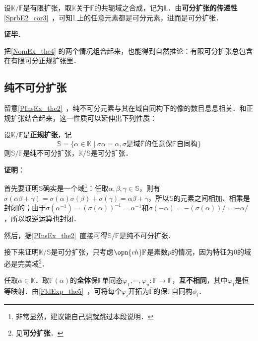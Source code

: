 设$\mathbb{K}/\mathbb{F}$是有限扩张，取$\mathbb{K}$关于$\mathbb{F}$的共轭域之合成，记为$\mathbb{L}$．由\textbf{可分扩张的传递性}\autoref{SprbE2_cor3}~，可知$\mathbb{L}$上的任意元素都是可分元素，进而是可分扩张．

\textbf{证毕}．

把\autoref{NomEx_the4} 的两个情况组合起来，也能得到自然推论：有限可分扩张总包含在有限可分正规扩张里．


\subsection{纯不可分扩张}



留意\autoref{PInsEx_the2}~，纯不可分元素与其在域自同构下的像的数目息息相关．和正规扩张结合起来，这一性质可以延伸出下列性质：

\begin{theorem}{}\label{NomEx_the5}
设$\mathbb{K}/\mathbb{F}$是\textbf{正规扩张}，记
\begin{equation}\label{NomEx_eq1}
\mathbb{S}=\{\alpha\in\mathbb{K}\mid \sigma\alpha = \alpha, \sigma\text{是域}\overline{\mathbb{F}}\text{的任意保}\mathbb{F}\text{自同构}\}
\end{equation}
则$\mathbb{S}/\mathbb{F}$是纯不可分扩张，$\mathbb{K}/\mathbb{S}$是可分扩张．
\end{theorem}

\textbf{证明}：

首先要证明$\mathbb{S}$确实是一个域\footnote{非常显然，建议能自己想就跳过本段说明．}：任取$\alpha, \beta, \gamma\in\mathbb{S}$，则有$\sigma(\alpha\beta+\gamma)=\sigma(\alpha)\sigma(\beta)+\sigma(\gamma)=\alpha\beta+\gamma$，所以$\mathbb{S}$的元素之间相加、相乘是封闭的；由于$\sigma(\alpha^{-1})=(\sigma(\alpha))^{-1}=\alpha^{-1}$和$\sigma(-\alpha)=-(\sigma(\alpha))/=-\alpha/$，所以取逆运算也封闭．

然后，据\autoref{PInsEx_the2}~直接可得$\mathbb{S}/\mathbb{F}$是纯不可分扩张．

接下来证明$\mathbb{K}/\mathbb{S}$是可分扩张，只考虑$\opn{ch}\mathbb{F}$是素数$p$的情况，因为特征为$0$的域必是完美域\footnote{见\textbf{可分扩张}．}．

任取$\alpha\in\mathbb{K}$．取$\mathbb{F}(\alpha)$的\textbf{全体}保$\mathbb{F}$单同态$\varphi_1, \cdots, \varphi_n:\mathbb{F}\to\overline{\mathbb{F}}$，\textbf{互不相同}，其中$\varphi_1$是恒等映射．由\autoref{FldExp_the5}~，可将每个$\varphi_i$开拓为$\overline{\mathbb{F}}$的保$\mathbb{F}$自同构$\phi_i$．

